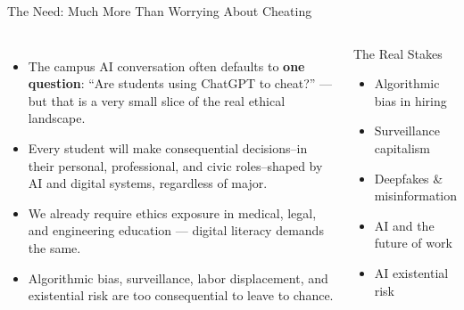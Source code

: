 \documentclass[aspectratio=169,10pt]{beamer}
\begin{document}
\begin{frame}{The Need: Much More Than Worrying About Cheating}
\begin{columns}[c]
\begin{itemize}
  \item The campus AI conversation often defaults to \textbf{one question}: ``Are students using ChatGPT to cheat?'' --- but that is a very small slice of the real ethical landscape.
  \item Every student will make consequential decisions--in their personal, professional, and civic roles--shaped by AI and digital systems, regardless of major.
  \item We already require ethics exposure in medical, legal, and engineering education --- digital literacy demands the same.
  \item Algorithmic bias, surveillance, labor displacement, and existential risk are too consequential to leave to chance.
\end{itemize}
\begin{alertblock}{The Real Stakes}
\footnotesize
\begin{itemize}
  \item Algorithmic bias in hiring
  \item Surveillance capitalism
  \item Deepfakes \& misinformation
  \item AI and the future of work
  \item AI existential risk
\end{itemize}
\end{alertblock}
\end{columns}
\end{frame}
\end{document}
